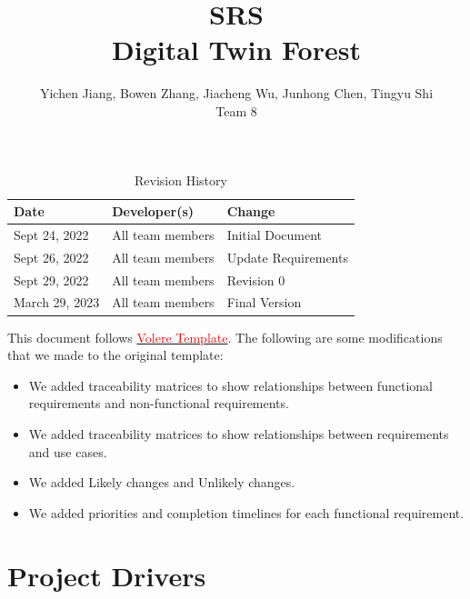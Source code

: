 \documentclass{article}
\title{SRS\\Digital Twin Forest}
\author{Yichen Jiang, Bowen Zhang, Jiacheng Wu, Junhong Chen, Tingyu Shi\\Team 8}
\begin{document}
\maketitle
\newpage
\begin{table}[htp]
\caption{Revision History} 
\begin{tabularx}{\textwidth}{llX}
\toprule
\textbf{Date} & \textbf{Developer(s)} & \textbf{Change}\\
\midrule
Sept 24, 2022 & All team members & Initial Document\\
\hline
Sept 26, 2022 & All team members & Update Requirements\\
\hline
Sept 29, 2022 & All team members & Revision 0\\
\hline
March 29, 2023 & All team members & Final Version\\
\bottomrule
\end{tabularx}
\end{table}

\vspace{5cm}

\noindent This document follows \href{https://www.cs.uic.edu/~i440/VolereMaterials/templateArchive16/c\%20Volere\%20template16.pdf}{\textcolor{red}{Volere Template}}.
The following are some modifications that we made to the 
original template:
\begin{itemize}
    \item We added traceability matrices to show relationships between
    functional requirements and non-functional requirements.
    \item We added traceability matrices to show relationships between requirements and 
    use cases.
    \item We added Likely changes and Unlikely changes.
    \item We added priorities and 
    completion timelines for each functional requirement.
\end{itemize}


\newpage

\tableofcontents
\listoftables
\listoffigures
\cleardoublepage

\section{Project Drivers}
\end{document}
